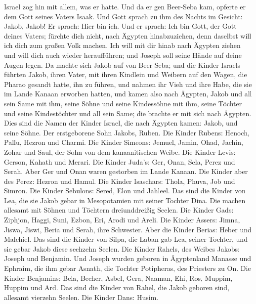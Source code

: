  Israel zog hin mit allem, was er hatte. Und da er gen
Beer-Seba kam, opferte er dem Gott seines Vaters Isaak.  Und
Gott sprach zu ihm des Nachts im Gesicht: Jakob, Jakob! Er sprach: Hier
bin ich.  Und er sprach: Ich bin Gott, der Gott deines
Vaters; fürchte dich nicht, nach Ägypten hinabzuziehen, denn daselbst
will ich dich zum großen Volk machen.  Ich will mit dir
hinab nach Ägypten ziehen und will dich auch wieder heraufführen; und
Joseph soll seine Hände auf deine Augen legen.  Da machte
sich Jakob auf von Beer-Seba; und die Kinder Israels führten Jakob,
ihren Vater, mit ihren Kindlein und Weibern auf den Wagen, die Pharao
gesandt hatte, ihn zu führen,  und nahmen ihr Vieh und ihre
Habe, die sie im Lande Kanaan erworben hatten, und kamen also nach
Ägypten, Jakob und all sein Same mit ihm,  seine Söhne und
seine Kindessöhne mit ihm, seine Töchter und seine Kindestöchter und all
sein Same; die brachte er mit sich nach Ägypten.  Dies sind
die Namen der Kinder Israel, die nach Ägypten kamen: Jakob, und seine
Söhne. Der erstgeborene Sohn Jakobs, Ruben.  Die Kinder
Rubens: Henoch, Pallu, Hezron und Charmi.  Die Kinder
Simeons: Jemuel, Jamin, Ohad, Jachin, Zohar und Saul, der Sohn von dem
kanaanitischen Weibe.  Die Kinder Levis: Gerson, Kahath und
Merari.  Die Kinder Juda's: Ger, Onan, Sela, Perez und
Serah. Aber Ger und Onan waren gestorben im Lande Kanaan. Die Kinder
aber des Perez: Hezron und Hamul.  Die Kinder Isaschars:
Thola, Phuva, Job und Simron.  Die Kinder Sebulons: Sered,
Elon und Jahleel.  Das sind die Kinder von Lea, die sie
Jakob gebar in Mesopotamien mit seiner Tochter Dina. Die machen allesamt
mit Söhnen und Töchtern dreiunddreißig Seelen.  Die Kinder
Gads: Ziphjon, Haggi, Suni, Ezbon, Eri, Arodi und Areli. 
Die Kinder Assers: Jimna, Jiswa, Jiswi, Beria und Serah, ihre Schwester.
Aber die Kinder Berias: Heber und Malchiel.  Das sind die
Kinder von Silpa, die Laban gab Lea, seiner Tochter, und sie gebar Jakob
diese sechzehn Seelen.  Die Kinder Rahels, des Weibes
Jakobs: Joseph und Benjamin.  Und Joseph wurden geboren in
Ägyptenland Manasse und Ephraim, die ihm gebar Asnath, die Tochter
Potipheras, des Priesters zu On.  Die Kinder Benjamins:
Bela, Becher, Asbel, Gera, Naaman, Ehi, Ros, Muppim, Huppim und Ard.
 Das sind die Kinder von Rahel, die Jakob geboren sind,
allesamt vierzehn Seelen.  Die Kinder Dans: Husim.
